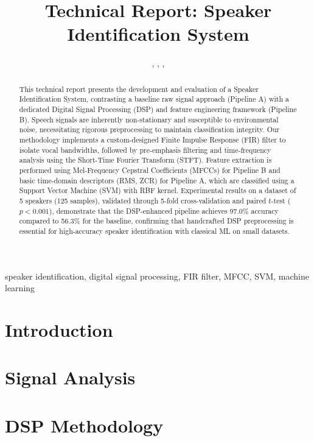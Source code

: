\documentclass[onecolumn]{IEEEtran}
\title{Technical Report: Speaker Identification System}
\author{
    \IEEEauthorblockN{Nguyen Huy Cuong},
    \IEEEauthorblockN{Hon Vi Dan},
    \IEEEauthorblockN{Le Nhut Thanh Quang},
    \IEEEauthorblockN{Nguyen Duc Minh Khoa}

    \IEEEauthorblockA{Supervisor: Dr. Dang Ngoc Minh Duc}
}
\begin{document}
\maketitle

\begin{abstract}
This technical report presents the development and evaluation of a Speaker Identification System, contrasting a baseline raw signal approach (Pipeline A) with a dedicated Digital Signal Processing (DSP) and feature engineering framework (Pipeline B). Speech signals are inherently non-stationary and susceptible to environmental noise, necessitating rigorous preprocessing to maintain classification integrity. Our methodology implements a custom-designed Finite Impulse Response (FIR) filter to isolate vocal bandwidths, followed by pre-emphasis filtering and time-frequency analysis using the Short-Time Fourier Transform (STFT). Feature extraction is performed using Mel-Frequency Cepstral Coefficients (MFCCs) for Pipeline B and basic time-domain descriptors (RMS, ZCR) for Pipeline A, which are classified using a Support Vector Machine (SVM) with RBF kernel. Experimental results on a dataset of 5 speakers (125 samples), validated through 5-fold cross-validation and paired $t$-test ($p < 0.001$), demonstrate that the DSP-enhanced pipeline achieves 97.0\% accuracy compared to 56.3\% for the baseline, confirming that handcrafted DSP preprocessing is essential for high-accuracy speaker identification with classical ML on small datasets.
\end{abstract}

\begin{IEEEkeywords}
speaker identification, digital signal processing, FIR filter, MFCC, SVM, machine learning
\end{IEEEkeywords}

\section{Introduction}


\section{Signal Analysis}



\section{DSP Methodology}

\end{document}
